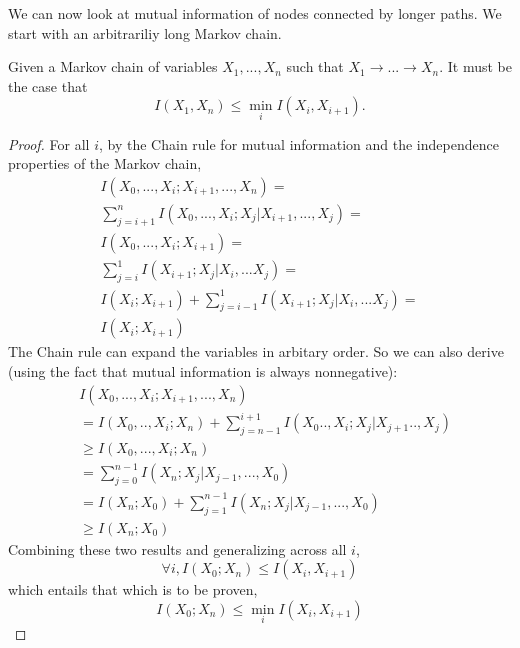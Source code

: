 \documentclass[../thesis.tex]{subfiles}
\begin{document}
We can now look at mutual information of nodes connected
by longer paths.
We start with an arbitrariliy long Markov chain.

\begin{center}
\end{center}

\begin{thm}
  \label{cdpi-thm}
  Given a Markov chain of variables $X_1, ..., X_n$
  such that $X_1 \rightarrow ... \rightarrow X_n$.
  It must be the case that
  $$I(X_1,X_n) \leq \min_i I(X_i,X_{i+1}).$$
\end{thm}
\begin{proof}
  \label{cdpi-prf}
  For all $i$, by the Chain rule for mutual information
  and the independence properties of the Markov chain,
  \begin{equation}
    \label{cdpi-prf-eq1}
    \begin{split}
      I(X_0, ..., X_{i} ; X_{i+1},...,X_n) = \\
      \sum_{j=i+1}^{n} I(X_0,...,X_{i}; X_j \vert X_{i+1},...,X_j) = \\
      I(X_0,...,X_{i}; X_{i+1}) = \\
      \sum_{j=i}^{1} I(X_{i+1}; X_{j} \vert X_i,...X_j) = \\
      I(X_i;X_{i+1}) + \sum_{j=i-1}^{1} I(X_{i+1}; X_{j} \vert X_i,...X_j) = \\
      I(X_i;X_{i+1})
    \end{split}
  \end{equation}
  The Chain rule can expand the variables in arbitary order.
  So we can also derive (using the fact that mutual information
  is always nonnegative):
  \begin{equation}
    \label{cdpi-prf-eq2}
    \begin{split}
      & I(X_0, ..., X_{i} ; X_{i+1},...,X_n) \\
      &= I(X_0, .., X_{i} ; X_n) + \sum_{j=n-1}^{i+1} I(X_{0}..,X_{i}; X_j \vert X_{j+1}..,X_j) \\
      &\geq I(X_0, ..., X_{i} ; X_n) \\
      &= \sum_{j = 0}^{n-1} I(X_n ; X_j \vert X_{j-1}, ... , X_0) \\
      &= I(X_n; X_0) + \sum_{j=1}^{n-1} I(X_n; X_j \vert X_{j-1}, ..., X_0) \\
      &\geq I(X_n; X_0)
    \end{split}
  \end{equation}
  Combining these two results and generalizing across all $i$,
  \begin{equation}
    \forall i, I(X_0;X_n) \leq I(X_i,X_{i+1})
  \end{equation}
  which entails that which is to be proven,
  \begin{equation}
    I(X_0;X_n) \leq \min_i I(X_i,X_{i+1})
  \end{equation}
\end{proof}
\end{document}
